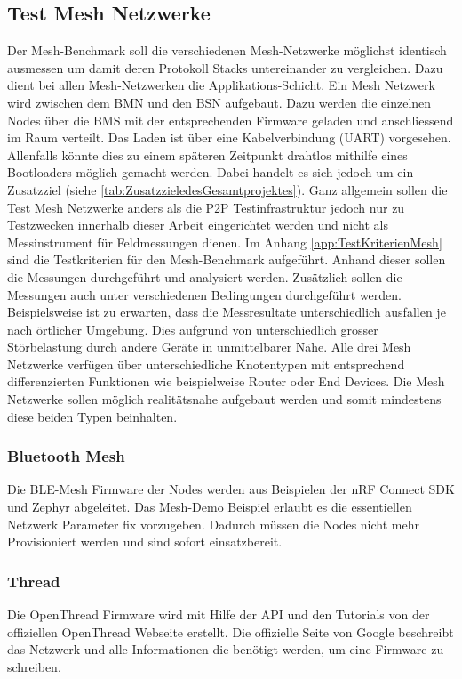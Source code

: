 \subsection{Test Mesh Netzwerke}\label{subsec:TestMeshNetzwerke}

Der Mesh-Benchmark soll die verschiedenen Mesh-Netzwerke möglichst identisch ausmessen um damit deren Protokoll Stacks untereinander zu vergleichen. Dazu dient bei allen Mesh-Netzwerken die Applikations-Schicht. Ein Mesh Netzwerk wird zwischen dem BMN und den BSN aufgebaut. Dazu werden die einzelnen Nodes über die BMS mit der entsprechenden Firmware geladen und anschliessend im Raum verteilt. Das Laden ist über eine Kabelverbindung (UART) vorgesehen. Allenfalls könnte dies zu einem späteren Zeitpunkt drahtlos mithilfe eines Bootloaders möglich gemacht werden. Dabei handelt es sich jedoch um ein Zusatzziel (siehe \ref{tab:ZusatzzieledesGesamtprojektes}). Ganz allgemein sollen die Test Mesh Netzwerke anders als die P2P Testinfrastruktur jedoch nur zu Testzwecken innerhalb dieser Arbeit eingerichtet werden und nicht als Messinstrument für Feldmessungen dienen.
Im Anhang \ref{app:TestKriterienMesh} sind die Testkriterien für den Mesh-Benchmark aufgeführt. Anhand dieser sollen die Messungen durchgeführt und analysiert werden. Zusätzlich sollen die Messungen auch unter verschiedenen Bedingungen durchgeführt werden. Beispielsweise ist zu erwarten, dass die Messresultate unterschiedlich ausfallen je nach örtlicher Umgebung. Dies aufgrund von unterschiedlich grosser Störbelastung durch andere Geräte in unmittelbarer Nähe.
Alle drei Mesh Netzwerke verfügen über unterschiedliche Knotentypen mit entsprechend differenzierten Funktionen wie beispielweise Router oder End Devices. Die Mesh Netzwerke sollen möglich realitätsnahe aufgebaut werden und somit mindestens diese beiden Typen beinhalten. 

\subsubsection{Bluetooth Mesh}\label{subsubsection:Bluetooth Mesh}

Die BLE-Mesh Firmware der Nodes werden aus Beispielen der nRF Connect SDK und Zephyr abgeleitet. Das Mesh-Demo Beispiel erlaubt es die essentiellen Netzwerk Parameter fix vorzugeben. Dadurch müssen die Nodes nicht mehr Provisioniert werden und sind sofort einsatzbereit.


\subsubsection{Thread}\label{subsubsection:Thread} 
Die OpenThread Firmware wird mit Hilfe der API und den Tutorials von der offiziellen OpenThread Webseite erstellt. Die offizielle Seite von Google beschreibt das Netzwerk und alle Informationen die benötigt werden, um eine Firmware zu schreiben.

